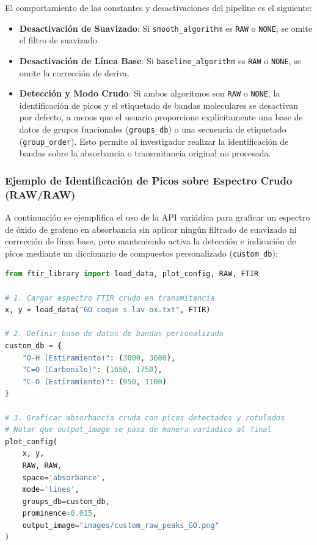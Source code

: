 \noindent El comportamiento de las constantes y desactivaciones del pipeline es el siguiente:
\begin{itemize}
    \item \textbf{Desactivación de Suavizado}: Si \texttt{smooth\_algorithm} es \texttt{RAW} o \texttt{NONE}, se omite el filtro de suavizado.
    \item \textbf{Desactivación de Línea Base}: Si \texttt{baseline\_algorithm} es \texttt{RAW} o \texttt{NONE}, se omite la corrección de deriva.
    \item \textbf{Detección y Modo Crudo}: Si ambos algoritmos son \texttt{RAW} o \texttt{NONE}, la identificación de picos y el etiquetado de bandas moleculares se desactivan por defecto, a menos que el usuario proporcione explícitamente una base de datos de grupos funcionales (\texttt{groups\_db}) o una secuencia de etiquetado (\texttt{group\_order}). Esto permite al investigador realizar la identificación de bandas sobre la absorbancia o transmitancia original no procesada.
\end{itemize}

\subsubsection{Ejemplo de Identificación de Picos sobre Espectro Crudo (RAW/RAW)}
A continuación se ejemplifica el uso de la API variádica para graficar un espectro de óxido de grafeno en absorbancia sin aplicar ningún filtrado de suavizado ni corrección de línea base, pero manteniendo activa la detección e indicación de picos mediante un diccionario de compuestos personalizado (\texttt{custom\_db}):

\begin{lstlisting}[language=Python, caption=Deteccion de picos en espectro de absorbancia crudo usando plot\_config]
from ftir_library import load_data, plot_config, RAW, FTIR

# 1. Cargar espectro FTIR crudo en transmitancia
x, y = load_data("GO coque s lav ox.txt", FTIR)

# 2. Definir base de datos de bandas personalizada
custom_db = {
    "O-H (Estiramiento)": (3000, 3600),
    "C=O (Carbonilo)": (1650, 1750),
    "C-O (Estiramiento)": (950, 1100)
}

# 3. Graficar absorbancia cruda con picos detectados y rotulados
# Notar que output_image se pasa de manera variadica al final
plot_config(
    x, y, 
    RAW, RAW, 
    space='absorbance', 
    mode='lines', 
    groups_db=custom_db,
    prominence=0.015,
    output_image="images/custom_raw_peaks_GO.png"
)
\end{lstlisting}

